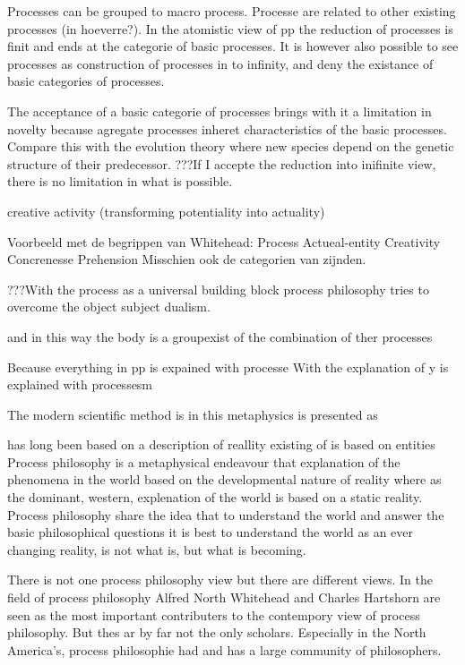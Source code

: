 \documentclass[a4paper]{Thesis}
\begin{document}
Processes can be grouped to macro process. Processe are related to other existing processes (in hoeverre?).
In the atomistic view of pp the reduction of processes is finit and ends at the categorie of basic processes. It is however also possible to see processes as construction of processes in to infinity, and deny the existance of basic categories of processes.

The acceptance of a basic categorie of processes brings with it a limitation in novelty because agregate processes inheret characteristics of the basic processes. Compare this with the evolution theory where new species depend on the genetic structure of their predecessor.
???If I accepte the reduction into inifinite view, there is no limitation in what is possible.

creative activity (transforming potentiality into actuality)

Voorbeeld met de begrippen van Whitehead:
Process
Actueal-entity
Creativity
Concrenesse
Prehension
Misschien ook de categorien van zijnden.


???With the process as a universal building block process philosophy tries to overcome the object subject dualism.

and in this way the body is a groupexist of the combination of ther processes

Because everything in pp is expained with processe
With the explanation of y is explained with processesm




The modern scientific method is 
in this metaphysics is presented as 


has long been based on a description of reallity existing of 
is based on entities
Process philosophy is a metaphysical endeavour that  explanation of the phenomena in the world based on the developmental nature of reality where as the dominant, western, explenation of the world is based on a static reality. 
Process philosophy share the idea that to understand the world and answer the basic philosophical questions it is best to understand the world as an ever changing reality, is not what is, but what is becoming.

There is not one process philosophy view but there are different views.
In the field of process philosophy Alfred North Whitehead and Charles Hartshorn are seen as the most important contributers to the contempory view of process philosophy. 
But thes ar by far not the only scholars. Especially in the North America's, process philosophie had and has a large community of philosophers. 
\end{document}
